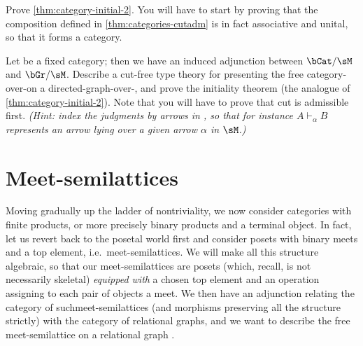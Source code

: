 \documentclass{book}
\let\types\vdash
\begin{document}
\begin{ex}
  Prove \cref{thm:category-initial-2}.
  You will have to start by proving that the composition defined in \cref{thm:categories-cutadm} is in fact associative and unital, so that it forms a category.
\end{ex}

\begin{ex}\label{ex:categories-over}
  Let \sM be a fixed category; then we have an induced adjunction between $\bCat/\sM$ and $\bGr/\sM$.
  Describe a cut-free type theory for presenting the free category-over-\sM on a directed-graph-over-\sM, and prove the initiality theorem (the analogue of \cref{thm:category-initial-2}).
  Note that you will have to prove that cut is admissible first.
  \textit{(Hint: index the judgments by arrows in \sM, so that for instance $A\types_\alpha B$ represents an arrow lying over a given arrow $\alpha$ in $\sM$.)}
\end{ex}


\section{Meet-semilattices}
\label{sec:mslat}

Moving gradually up the ladder of nontriviality, we now consider categories with finite products, or more precisely binary products and a terminal object.
In fact, let us revert back to the posetal world first and consider posets with binary meets and a top element, i.e.\ meet-semilattices.
We will make all this structure algebraic, so that our meet-semilattices are posets (which, recall, is not necessarily skeletal) \emph{equipped with} a chosen top element and an operation assigning to each pair of objects a meet.
We then have an adjunction relating the category \bmSLat of suchmeet-semilattices (and morphisms preserving all the structure strictly) with the category \bRelGr of relational graphs, and we want to describe the free meet-semilattice on a relational graph \cG.
\end{document}
